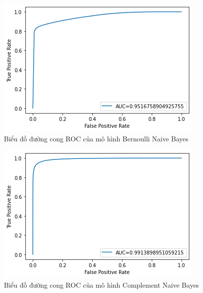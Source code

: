 \documentclass[../DoAn.tex]{subfiles}
\begin{document}
\begin{figure}
\centering
\includegraphics[width=1\linewidth]{Hinh_ve/BernoulliNB.png}
\caption{Biểu đồ đường cong ROC của mô hình Bernoulli Naive Bayes}
\label{fig:BerNB}
\end{figure}

\begin{figure}
\centering
\includegraphics[width=1\linewidth]{Hinh_ve/ComplementNB.png}
\caption{Biểu đồ đường cong ROC của mô hình Complement Naive Bayes}
\label{fig:CompleteNB}
\end{figure}
\end{document}

